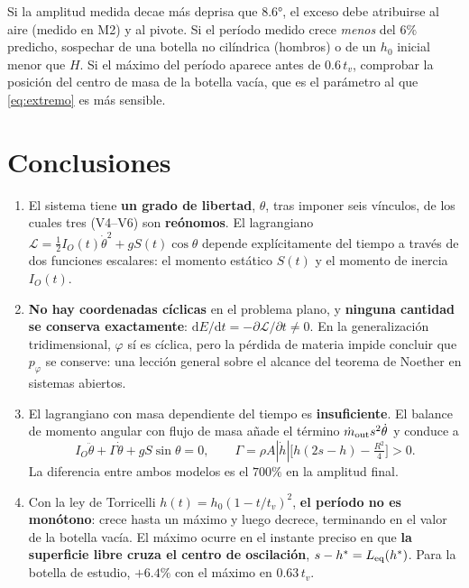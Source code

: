 \documentclass[11pt,a4paper]{article}
\newcommand{\dd}{\mathrm{d}}
\begin{document}
Si la amplitud medida decae más deprisa que $\ang{8.6}$, el exceso debe atribuirse al aire
(medido en M2) y al pivote. Si el período medido crece \emph{menos} del $6\%$ predicho, sospechar
de una botella no cilíndrica (hombros) o de un $h_0$ inicial menor que $H$. Si el máximo del
período aparece antes de $0.6\,t_v$, comprobar la posición del centro de masa de la botella vacía,
que es el parámetro al que \eqref{eq:extremo} es más sensible.

\section{Conclusiones}

\begin{enumerate}[leftmargin=*,itemsep=4pt]

\item El sistema tiene \textbf{un grado de libertad}, $\theta$, tras imponer seis vínculos, de los
cuales tres (V4--V6) son \textbf{reónomos}. El lagrangiano
$\mathcal L=\tfrac12 I_O(t)\dot\theta^2+gS(t)\cos\theta$ depende explícitamente del tiempo a través
de dos funciones escalares: el momento estático $S(t)$ y el momento de inercia $I_O(t)$.

\item \textbf{No hay coordenadas cíclicas} en el problema plano, y \textbf{ninguna cantidad se
conserva exactamente}: $\dd E/\dd t = -\partial\mathcal L/\partial t \ne 0$. En la generalización
tridimensional, $\varphi$ sí es cíclica, pero la pérdida de materia impide concluir que $p_\varphi$
se conserve: una lección general sobre el alcance del teorema de Noether en sistemas abiertos.

\item El lagrangiano con masa dependiente del tiempo es \textbf{insuficiente}. El balance de
momento angular con flujo de masa añade el término $\dot m_{\rm out}s^2\dot\theta$ y conduce a
\[
I_O\ddot\theta+\Gamma\dot\theta+gS\sin\theta=0,\qquad
\Gamma=\rho A|\dot h|\Big[h(2s-h)-\tfrac{R^2}{4}\Big]>0 .
\]
La diferencia entre ambos modelos es el $700\%$ en la amplitud final.

\item Con la ley de Torricelli $h(t)=h_0(1-t/t_v)^2$, \textbf{el período no es monótono}:
crece hasta un máximo y luego decrece, terminando en el valor de la botella vacía. El máximo ocurre
en el instante preciso en que \textbf{la superficie libre cruza el centro de oscilación},
$s-h^\ast=L_{\rm eq}(h^\ast)$. Para la botella de estudio, $+6.4\%$ con el máximo en $0.63\,t_v$.


\end{enumerate}
\end{document}
